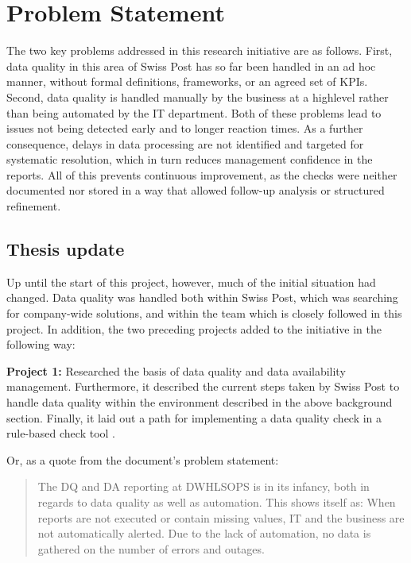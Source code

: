 

\section{Problem Statement}

The two key problems addressed in this research initiative are as follows. First, data quality in this area of Swiss Post has so far been handled in an ad hoc manner, without formal definitions, frameworks, or an agreed set of KPIs. Second, data quality is handled manually by the business at a \gls{highlevel} rather than being automated by the IT department. Both of these problems lead to issues not being detected early and to longer reaction times. As a further consequence, delays in data processing are not identified and targeted for systematic resolution, which in turn reduces management confidence in the reports. All of this prevents continuous improvement, as the checks were neither documented nor stored in a way that allowed follow-up analysis or structured refinement.



\subsection*{Thesis update}
Up until the start of this project, however, much of the initial situation had changed. Data quality was handled both within Swiss Post, which was searching for company-wide solutions, and within the team which is closely followed in this project. In addition, the two preceding projects added to the initiative in the following way:

\textbf{Project 1: }Researched the basis of data quality and data availability management. Furthermore, it described the current steps taken by Swiss Post to handle data quality within the environment described in the above background section. Finally, it laid out a path for implementing a data quality check in a rule-based check tool \cite{Roccaro2026_Project1}.

Or, as a quote from the document's problem statement:

\begin{quote}
The \gls{DQ} and \gls{DA} reporting at
\gls{DWHLSOPS} is in its infancy, both
in regards to data quality as well as automation.
This shows itself as: When reports are not executed
or contain missing values, IT and the business are
not automatically alerted. Due to the lack of
automation, no data is gathered on the number of
errors and outages.
\end{quote}


